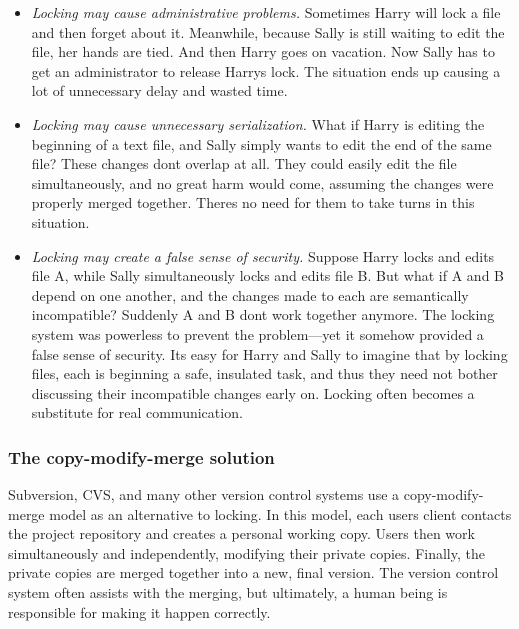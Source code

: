 \begin{itemize}
\item
  \emph{Locking may cause administrative problems.} Sometimes Harry will
  lock a file and then forget about it. Meanwhile, because Sally is
  still waiting to edit the file, her hands are tied. And then Harry
  goes on vacation. Now Sally has to get an administrator to release
  Harry\textquotesingle s lock. The situation ends up causing a lot of
  unnecessary delay and wasted time.
\item
  \emph{Locking may cause unnecessary serialization.} What if Harry is
  editing the beginning of a text file, and Sally simply wants to edit
  the end of the same file? These changes don\textquotesingle t overlap
  at all. They could easily edit the file simultaneously, and no great
  harm would come, assuming the changes were properly merged together.
  There\textquotesingle s no need for them to take turns in this
  situation.
\item
  \emph{Locking may create a false sense of security.} Suppose Harry
  locks and edits file A, while Sally simultaneously locks and edits
  file B. But what if A and B depend on one another, and the changes
  made to each are semantically incompatible? Suddenly A and B
  don\textquotesingle t work together anymore. The locking system was
  powerless to prevent the problem---yet it somehow provided a false
  sense of security. It\textquotesingle s easy for Harry and Sally to
  imagine that by locking files, each is beginning a safe, insulated
  task, and thus they need not bother discussing their incompatible
  changes early on. Locking often becomes a substitute for real
  communication.
\end{itemize}

\subsubsection{The copy-modify-merge
solution}\label{svn.basic.vsn-models.copy-merge}

Subversion, CVS, and many other version control systems use a
copy-modify-merge model as an alternative to locking. In this model,
each user\textquotesingle s client contacts the project repository and
creates a personal working copy. Users then work simultaneously and
independently, modifying their private copies. Finally, the private
copies are merged together into a new, final version. The version
control system often assists with the merging, but ultimately, a human
being is responsible for making it happen correctly.

